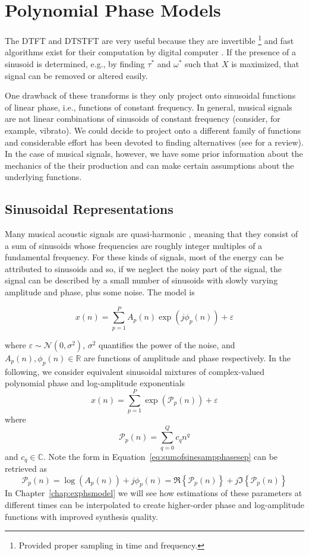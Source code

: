 \section{Polynomial Phase Models\label{sec:polynomphasemodel}}

The DTFT and DTSTFT are very useful because they are invertible
\cite{portnoff1976implementation}%
\footnote{Provided proper sampling in time and frequency.}
and fast algorithms exist for their 
computation by digital computer \cite{van1992computational}. If the presence of
a sinusoid is determined, e.g., by finding $\tau^{\ast}$ and $\omega^{\ast}$ such that
$X$ is maximized, that signal can be removed or altered easily.

One drawback of these transforms is they only project onto sinusoidal functions
of linear phase, i.e., functions of constant frequency. In general, musical
signals are not linear combinations of sinusoids of constant frequency
(consider, for example, vibrato). We could decide to project onto a different
family of functions and considerable effort has been devoted to finding
alternatives (see \cite{kereliuk2011sparse} for a review). In the case of
musical signals, however, we have some prior information about the mechanics of
the their production and can make certain assumptions about the underlying
functions.

\subsection{Sinusoidal Representations\label{sec:mqfmfromphase}} Many musical
acoustic signals are quasi-harmonic \cite{fletcher2012physics}, meaning that
they consist of a sum of sinusoids whose frequencies are roughly integer
multiples of a fundamental frequency. For these kinds of signals, most of the
energy can be attributed to sinusoids and so, if we neglect the noisy part of
the signal, the signal can be described by a small number of sinusoids with
slowly varying amplitude and phase, plus some noise. The model is

\begin{equation}
    \label{eq:sumofsinesampphasesep}
    x(n)=\sum_{p=1}^{P} A_p(n) \exp(j \phi_p(n)) + \varepsilon
\end{equation}

where $\varepsilon \sim \mathcal{N}(0,\sigma^{2})$, $\sigma^{2}$ quantifies the power of
the noise, and $A_{p}(n),\phi_{p}(n) \in \mathbb{R}$ are functions of amplitude and
phase respectively. In the following, we consider equivalent sinusoidal mixtures
of complex-valued polynomial phase and log-amplitude exponentials
\[
    x(n)=\sum_{p=1}^{P} \exp(\mathcal{P}_p(n)) + \varepsilon
\]
where
\[
    \mathcal{P}_p(n) = \sum_{q=0}^{Q} c_q n^{q}
\]
and $c_q \in \mathbb{C}$. Note the form in
Equation~\ref{eq:sumofsinesampphasesep} can be retrieved as
\[
    \mathcal{P}_p(n) = \log(A_p(n)) +  j \phi_p(n) =
    \Re\left\{\mathcal{P}_p(n)\right\} +
    j\Im\left\{\mathcal{P}_p(n)\right\}
\]
In Chapter~\ref{chap:exphsmodel} we will see how estimations of these parameters
at different times can be interpolated to create higher-order phase and
log-amplitude functions
with improved synthesis quality.


